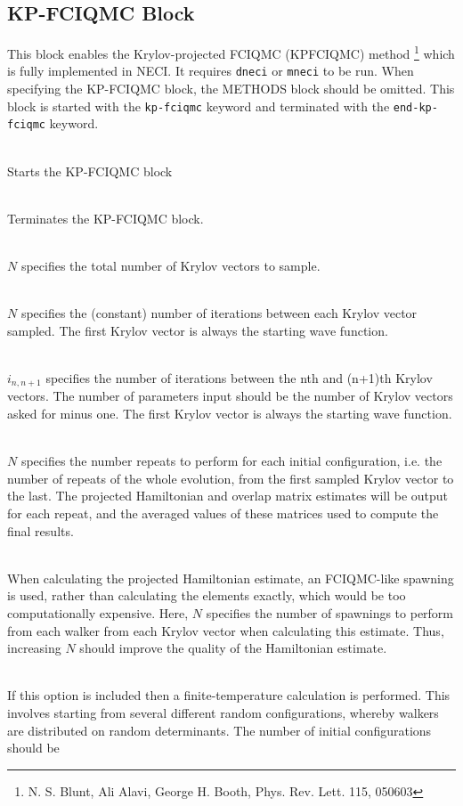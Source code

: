 \documentclass[a4paper,notitlepage]{scrreprt}
\newcommand\codeitem[1]{\needspace{1.5\baselineskip}\item[\textnormal{\ttfamily #1 \nopagebreak}] \hfill \\ \nopagebreak}
\begin{document}
  \subsection{KP-FCIQMC Block}
  This block enables the Krylov-projected FCIQMC (KPFCIQMC) method \footnote{N. S. Blunt, Ali
    Alavi, George H. Booth, Phys. Rev. Lett. 115, 050603} which is fully implemented
  in NECI. It requires \texttt{dneci} or \texttt{mneci} to be run. When
  specifying the KP-FCIQMC block, the METHODS block should be omitted. This
  block is started with the \texttt{kp-fciqmc} keyword and terminated with
  the \texttt{end-kp-fciqmc} keyword.
  \begin{description}
    \codeitem{kp-fciqmc}
    Starts the KP-FCIQMC block
    \codeitem{end-kp-fciqmc}
    Terminates the KP-FCIQMC block.    
    \codeitem{num-krylov-vecs $N$}
    $N$ specifies the total number of Krylov vectors to sample.
    \codeitem{num-iters-between-vecs $N$}
    $N$ specifies the (constant) number of iterations between each Krylov
    vector sampled. The first Krylov vector is always the starting wave
    function.
    \codeitem{num-iters-between-vecs-vary $i_{12}$, $i_{23}$, $i_{34}$...}
    $i_{n,n+1}$ specifies the number of iterations between the nth and
    (n+1)th Krylov vectors. The number of parameters input should be
    the number of Krylov vectors asked for minus one. The first Krylov
    vector is always the starting wave function.
    \codeitem{num-repeats-per-init-config $N$}
    $N$ specifies the number repeats to perform for each initial
    configuration, i.e. the number of repeats of the whole evolution,
    from the first sampled Krylov vector to the last. The projected
    Hamiltonian and overlap matrix estimates will be output for each
    repeat, and the averaged values of these matrices used to compute
    the final results.
    \codeitem{averagemcexcits-hamil $N$}
    When calculating the projected Hamiltonian estimate, an FCIQMC-like
    spawning is used, rather than calculating the elements exactly,
    which would be too computationally expensive. Here, $N$ specifies the
    number of spawnings to perform from each walker from each Krylov
    vector when calculating this estimate. Thus, increasing $N$ should
    improve the quality of the Hamiltonian estimate.
    \codeitem{finite-temperature}
    If this option is included then a finite-temperature calculation is
    performed. This involves starting from several different random
    configurations, whereby walkers are distributed on random
    determinants. The number of initial configurations should be

\end{description}
\end{document}
